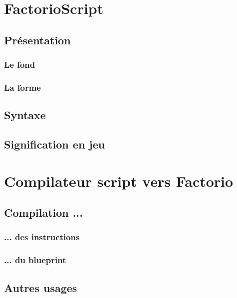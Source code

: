 \documentclass{scrreprt}
\begin{document}
    	
    \part{FactorioScript}
    
    \chapter{Présentation}
	\section{Le fond}

	\section{La forme}

    \chapter{Syntaxe}

    \chapter{Signification en jeu}

    \part{Compilateur script vers Factorio}
    	
    \chapter{Compilation ...}
	\section{... des instructions}
	
	\section{... du blueprint}

    \chapter{Autres usages}
\end{document}
